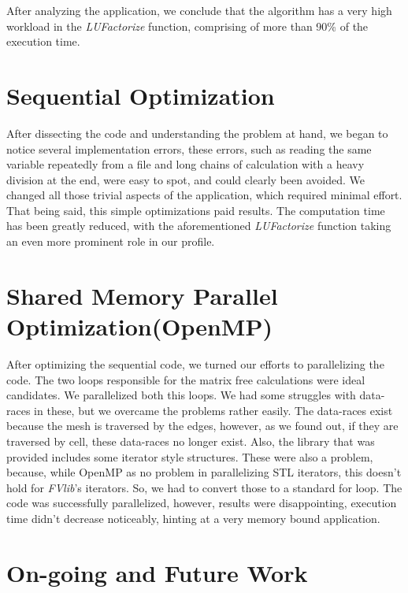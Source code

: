 \documentclass[a4paper,10pt,openright,openbib,twocolumn]{article}
\begin{document}
After analyzing the application, we conclude that the algorithm has a very high workload in the \emph{LUFactorize} function, comprising of more than 90\% of the execution time.


\section{Sequential Optimization}


After dissecting the code and understanding the problem at hand, we began to notice several implementation errors, these errors, such as reading the same variable repeatedly from a file and long chains of calculation with a heavy division at the end, were easy to spot, and could clearly been avoided. We changed all those trivial aspects of the application, which required minimal effort. That being said, this simple optimizations paid results. The computation time has been greatly reduced, with the aforementioned \emph{LUFactorize} function taking an even more prominent role in our profile.


\section{Shared Memory Parallel Optimization(OpenMP)}

After optimizing the sequential code, we turned our efforts to parallelizing the code. The two loops responsible for the matrix free calculations were ideal candidates. We parallelized both this loops. We had some struggles with data-races in these, but we overcame the problems rather easily. The data-races exist because the mesh is traversed by the edges, however, as we found out, if they are traversed by cell, these data-races no longer exist. Also, the library that was provided includes some iterator style structures. These were also a problem, because, while OpenMP as no problem in parallelizing STL iterators, this doesn't hold for \emph{FVlib}'s iterators. So, we had to convert those to a standard for loop. The code was successfully parallelized, however, results were disappointing, execution time didn't decrease noticeably, hinting at a very memory bound application. 

\section{On-going and Future Work}    %
\end{document}

